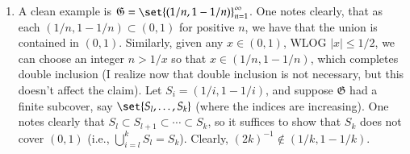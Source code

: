 \documentclass[12pt]{article}
\theoremstyle{definition}
\theoremstyle{remark}
\begin{document}
	\begin{enumerate}[leftmargin=\labelsep]
		
		
		
		\item A clean example is $\mathfrak{G} = \set{(1/n, 1-1/n)}_{n=1}^\infty$. One notes clearly, that as each $(1/n, 1-1/n) \subset (0, 1)$ for positive $n$, we have that the union is contained in $(0, 1)$. Similarly, given any $x \in (0, 1)$, WLOG $|x| \leq 1/2$, we can choose an integer $n > 1/x$ so that $x \in (1/n, 1-1/n)$, which completes double inclusion (I realize now that double inclusion is not necessary, but this doesn't affect the claim). Let $S_i = (1/i, 1-1/i)$, and suppose $\mathfrak{G}$ had a finite subcover, say $\set{S_l, \ldots, S_k}$ (where the indices are increasing). One notes clearly that $S_l \subset S_{l+1} \subset \cdots \subset S_k$, so it suffices to show that $S_k$ does not cover $(0, 1)$ (i.e., $\bigcup_{i=l}^k S_l = S_k$). Clearly, $(2k)^{-1} \not \in (1/k, 1-1/k)$.
		

\end{enumerate}
\end{document}
